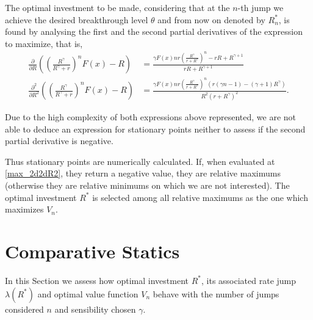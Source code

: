 The optimal investment to be made, considering that at the $n$-th jump we achieve the desired breakthrough level $\theta$ and from now on denoted by $R^*_n$, is found by analysing the first and the second partial derivatives of the expression to maximize, that is,
\begin{align}
\frac{\partial}{\partial R} \left( \left( \frac{R^\gamma}{R^\gamma+r}\right)^n F(x)-R \right) &= \frac{\gamma  F(x) n r \left(\frac{R^{\gamma }}{r+R^{\gamma }}\right)^n-r R+R^{\gamma +1}}{r R+R^{\gamma +1}} \label{max_2ddR}\\
\frac{\partial^2}{\partial R^2} \left( \left( \frac{R^\gamma}{R^\gamma+r}\right)^n F(x)-R\right) &=
\frac{\gamma  F(x) n r \left(\frac{R^{\gamma }}{r+R^{\gamma }}\right)^n \left(r (\gamma  n-1)-(\gamma +1) R^{\gamma }\right)}{R^2 \left(r+R^{\gamma }\right)^2}.
\label{max_2d2dR2}
\end{align}

Due to the high complexity of both expressions above represented, we are not able to deduce an expression for stationary points neither to assess if the second partial derivative is negative.

Thus stationary points are numerically calculated. If, when evaluated at \eqref{max_2d2dR2}, they return a negative value, they are relative maximums (otherwise they are relative minimums on which we are not interested). The optimal investment $R^*$ is selected among all relative maximums as the one which maximizes $V_n$.














\section{Comparative Statics}
\label{maximexp_cs}

In this Section we assess how optimal investment $R^*$, its associated rate jump $\lambda(R^*)$ and optimal value function $V_n$ behave with the number of jumps considered $n$ and sensibility chosen $\gamma$.



